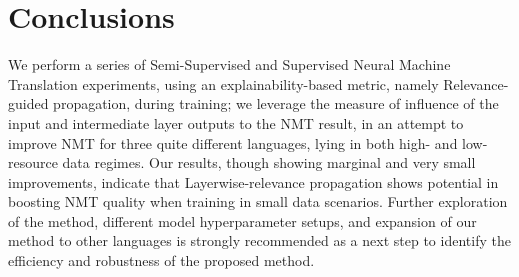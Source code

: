 \documentclass[11pt]{article}
\begin{document}
\begin{comment}
In Figures \ref{fig:robust_over_batches_fr} and \ref{fig:robust_over_batches_gu} we show model Robustness scores on the perturbed sentences generated translations for all directions, perturbations, and setups throughout the entire training process. For En - Fr, Fr - En, our model is consistently robust, but what is interesting to observe is that Robustness values are relatively stable as the model processes more and more tokens, for misspelled sentences, and slightly fluctuating for sentences modified with a case-changing perturbation.
Robustness' relative stability across training can be seen in En - Gu and Gu - En NMT model figures.
We can make similar observations for model consistency in all training setups and directions, as seen in Figures \ref{fig:consist_over_batches_fr} and 
\ref{fig:consist_over_batches_gu}. 
Hence, we can conclude that our NMT models' robustness and consistency change very little during training, regardless of the setup, the languages and translation direction, though they depend highly on the training objectives, where Back-Translation and usage of parallel data are high influence factors depending on the language morphological complexity and the amount of data used in training.

\end{comment}




\begin{comment}
%
%

%

\end{comment}

\section{Conclusions}
We perform a series of Semi-Supervised and Supervised Neural Machine Translation experiments, using an explainability-based metric, namely Relevance-guided propagation, during training; we leverage the measure of influence of the input and intermediate layer outputs to the NMT result, in an attempt to improve NMT for three quite different languages, lying in both high- and low- resource data regimes. Our results, though showing marginal and very small improvements, indicate that Layerwise-relevance propagation shows potential in boosting NMT quality when training in small data scenarios. Further exploration of the method, different model hyperparameter setups, and expansion of our method to other languages is strongly recommended as a next step to identify the efficiency and robustness of the proposed method.
\end{document}
